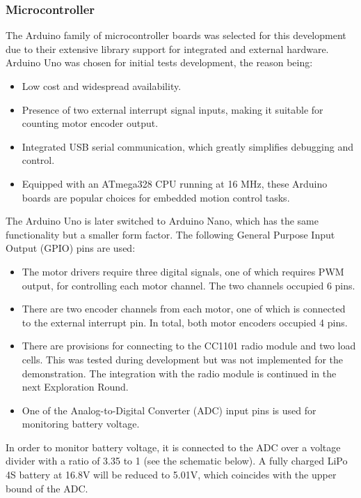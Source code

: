 \subsubsection{Microcontroller}
\label{subsubsection:exploration-1-microcontroller}

The Arduino family of microcontroller boards was selected for this development due to their extensive library support for integrated and external hardware. 
Arduino Uno was chosen for initial tests development, the reason being:
\begin{itemize}
    \item Low cost and widespread availability.
    \item Presence of two external interrupt signal inputs, making it suitable for counting motor encoder output. 
    \item Integrated USB serial communication, which greatly simplifies debugging and control.
    \item Equipped with an ATmega328 CPU running at 16 MHz, these Arduino boards are popular choices for embedded motion control tasks.
\end{itemize}

The Arduino Uno is later switched to Arduino Nano, which has the same functionality but a smaller form factor. The following General Purpose Input Output (GPIO) pins are used:
\begin{itemize}
    \item The motor drivers require three digital signals, one of which requires PWM output, for controlling each motor channel. The two channels occupied 6 pins. 
    \item There are two encoder channels from each motor, one of which is connected to the external interrupt pin. In total, both motor encoders occupied 4 pins.
    \item There are provisions for connecting to the CC1101 radio module and two load cells. This was tested during development but was not implemented for the demonstration. The integration with the radio module is continued in the next Exploration Round.
    \item One of the Analog-to-Digital Converter (ADC) input pins is used for monitoring battery voltage.
\end{itemize}

In order to monitor battery voltage, it is connected to the ADC over a voltage divider with a ratio of 3.35 to 1 (see the schematic below). A fully charged LiPo 4S battery at 16.8V will be reduced to 5.01V, which coincides with the upper bound of the ADC. 

